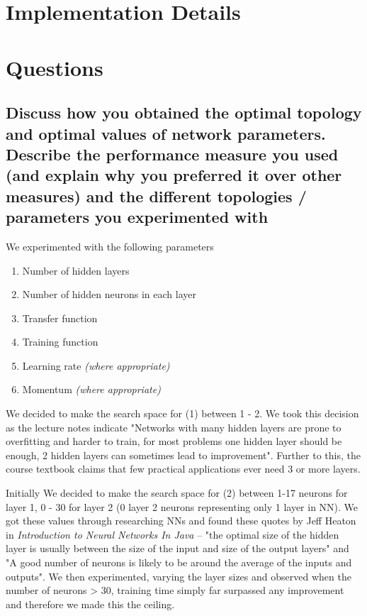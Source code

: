 \documentclass[11pt]{article}
\begin{document}
\section{Implementation Details}
\section{Questions}

\subsection{Discuss how you obtained the optimal topology and optimal values of network parameters. Describe the performance measure you used (and explain why you preferred it over other measures) and the different topologies / parameters you experimented with}



We experimented with the following parameters
\begin{enumerate}
  \item Number of hidden layers
  \item Number of hidden neurons in each layer
  \item Transfer function
  \item Training function
  \item Learning rate \emph{(where appropriate)}
  \item Momentum \emph{(where appropriate)}
\end{enumerate}

We decided to make the search space for (1) between 1 - 2. We took this decision as the lecture notes indicate "Networks with many hidden layers are prone to overfitting and harder to train, for most problems one hidden layer should be enough, 2 hidden layers can sometimes lead to improvement". Further to this, the course textbook claims that few practical applications ever need 3 or more layers.

Initially We decided to make the search space for (2) between 1-17 neurons for layer 1, 0 - 30 for layer 2 (0 layer 2 neurons representing only 1 layer in NN). We got these values through researching NNs and found these quotes by Jeff Heaton in \emph{Introduction to Neural Networks In Java} -- "the optimal size of the hidden layer is usually between the size of the input and size of the output layers" and "A good number of neurons is likely to be around the average of the inputs and outputs". We then experimented, varying the layer sizes and observed when the number of neurons > 30, training time simply far surpassed any improvement and therefore we made this the ceiling.
\end{document}
